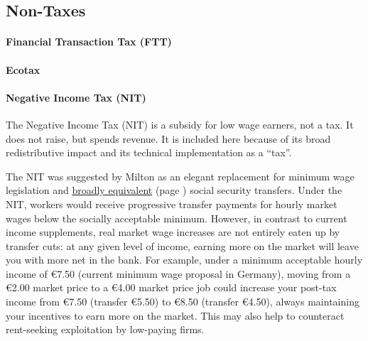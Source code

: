 

\subsection{Non-Taxes}

\paragraph{Financial Transaction Tax (FTT)}
	\label{sec:FTT}

\paragraph{Ecotax}
	\label{sec:Ecotax}

\paragraph{Negative Income Tax (NIT)}
	\label{sec:NIT}
The Negative Income Tax (NIT) is a subsidy for low wage earners, not a tax.
It does not raise, but spends revenue.
It is included here because of its broad redistributive impact and its technical implementation as a ``tax''.

The NIT was suggested by Milton \cite{Friedman1962} as an elegant replacement for minimum wage legislation and \hyperref[sec:StructuralUnemployment]{broadly equivalent} (page \pageref{sec:StructuralUnemployment}) social security transfers.
Under the NIT, workers would receive progressive transfer payments for hourly market wages below the socially acceptable minimum.
However, in contrast to current income supplements, real market wage increases are not entirely eaten up by transfer cuts:
at any given level of income, earning more on the market will leave you with more net in the bank.
For example, under a minimum acceptable hourly income of \euro{}7.50 (current minimum wage proposal in Germany), moving from a \euro{}2.00 market price to a \euro{}4.00 market price job could increase your post-tax income from \euro{}7.50 (transfer \euro{}5.50) to \euro{}8.50 (transfer \euro{}4.50), always maintaining your incentives to earn more on the market.
This may also help to counteract rent-seeking exploitation by low-paying firms.

